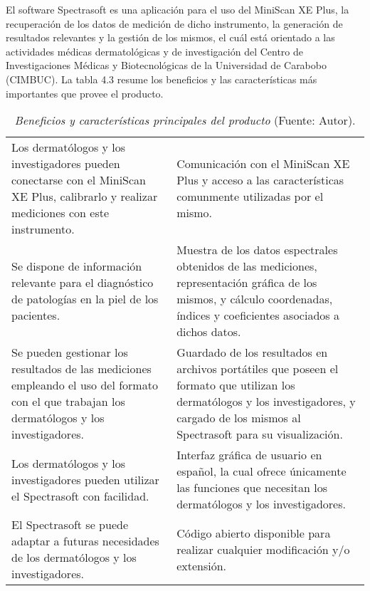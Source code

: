 	El software Spectrasoft es una aplicaci\'{o}n para el uso del MiniScan XE Plus, la recuperaci\'{o}n de los datos de medici\'{o}n de dicho instrumento, la generaci\'{o}n de resultados relevantes y la gesti\'{o}n de los mismos, el cu\'{a}l est\'{a} orientado a las actividades m\'{e}dicas dermatol\'{o}gicas y de investigaci\'{o}n del Centro de Investigaciones M\'{e}dicas y Biotecnol\'{o}gicas de la Universidad de Carabobo (CIMBUC). La tabla 4.3 resume los beneficios y las caracter\'{i}sticas m\'{a}s importantes que provee el producto.
	
	\begin{table}[h]
		\small
		\caption[Beneficios y caracter\'{i}sticas principales del producto]{\textit{Beneficios y caracter\'{i}sticas principales del producto} (Fuente: Autor).}
		\centering
		\setlength{\extrarowheight}{\altocelda}
		\begin{tabulary}{\anchotabla}{|J|J|}
			\hline
			 & \\ \hline
			Los dermat\'{o}logos y los investigadores pueden conectarse con el MiniScan XE Plus, calibrarlo y realizar mediciones con este instrumento. & 
			Comunicaci\'{o}n con el MiniScan XE Plus y acceso a las caracter\'{i}sticas comunmente utilizadas por el mismo.\\ \hline
			Se dispone de informaci\'{o}n relevante para el diagn\'{o}stico de patolog\'{i}as en la piel de los pacientes. &
			Muestra de los datos espectrales obtenidos de las mediciones, representaci\'{o}n gr\'{a}fica de los mismos, y c\'{a}lculo coordenadas, \'{i}ndices y coeficientes asociados a dichos datos.\\ \hline
			Se pueden gestionar los resultados de las mediciones empleando el uso del formato con el que trabajan los dermat\'{o}logos y los investigadores. &
			Guardado de los resultados en archivos port\'{a}tiles que poseen el formato que utilizan los dermat\'{o}logos y los investigadores, y cargado de los mismos al Spectrasoft para su visualizaci\'{o}n.\\ \hline
			Los dermat\'{o}logos y los investigadores pueden utilizar el Spectrasoft con facilidad. &
			Interfaz gr\'{a}fica de usuario en espa\~{n}ol, la cual ofrece \'{u}nicamente las funciones que necesitan los dermat\'{o}logos y los investigadores.\\ \hline
			El Spectrasoft se puede adaptar a futuras necesidades de los dermat\'{o}logos y los investigadores. &
			C\'{o}digo abierto disponible para realizar cualquier modificaci\'{o}n y/o extensi\'{o}n.\\ \hline
		\end{tabulary}
	\end{table}
	
